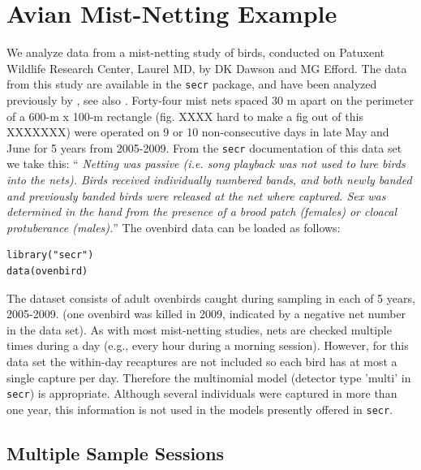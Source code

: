 \section{Avian Mist-Netting Example}

We analyze data from a mist-netting study of birds, conducted on
Patuxent Wildlife Research Center, Laurel MD, by DK Dawson and MG
Efford. The data from this study are available in the \mbox{\tt secr}
package, and have been analyzed previously by
\citet{efford_etal:2004}, see also \citet{borchers_efford:2008}.
Forty-four mist nets spaced 30 m apart on the perimeter of a 600-m x
100-m rectangle (fig. XXXX hard to make a fig out of this XXXXXXX) were operated on 9 or 10 non-consecutive
days in late May and June for 5 years from 2005-2009.  From the
\mbox{\tt secr} documentation of this data set we take this: ``{\it
  Netting was passive (i.e. song playback was not used to lure birds
  into the nets). Birds received individually numbered bands, and both
  newly banded and previously banded birds were released at the net
  where captured. Sex was determined in the hand from the presence of
  a brood patch (females) or cloacal protuberance (males).}''  
The ovenbird 
data can be loaded as follows:
\begin{verbatim}
library("secr")
data(ovenbird)
\end{verbatim}
The dataset consists of adult ovenbirds caught during sampling in each
of 5 years, 2005-2009. (one ovenbird was killed in 2009, indicated by
a negative net number in the data set).  
As with most mist-netting studies, nets are checked multiple times
during a day (e.g., every hour during a morning session). However, for
this data set the within-day recaptures are not included so each bird
has at most a single capture per day. Therefore the multinomial model
(detector type 'multi' in \mbox{\tt secr}) is appropriate. 
 Although
several individuals were captured in more than one year, this
information is not used in the models presently offered in \mbox{\tt secr}.


\subsection{Multiple Sample Sessions}

